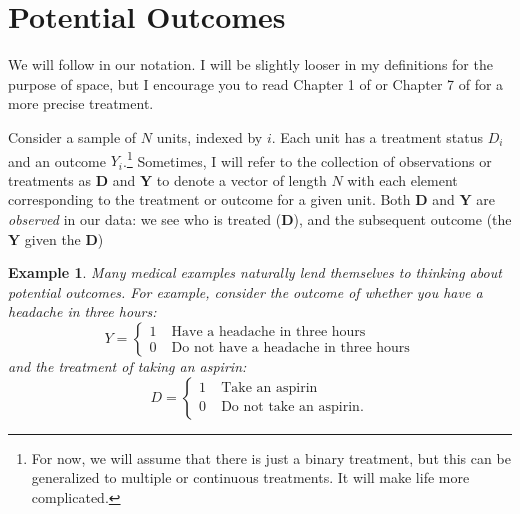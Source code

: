 \documentclass{tufte-handout}
\theoremstyle{break}
\newtheorem{exmp}{Example}
\newcommand{\bY}{\mathbf{Y}}
\newcommand{\bD}{\mathbf{D}}
\begin{document}
\section{Potential Outcomes}
We will follow \citet{imbens2015causal} in our notation. I will be slightly looser in my definitions for the purpose of space, but I encourage you to read Chapter 1 of \citet{imbens2015causal} or Chapter 7 of \citet{aronow2019foundations} for a more precise treatment.

Consider a sample of $N$ units, indexed by $i$. Each unit has a treatment status $D_i$ and an outcome $Y_i$.\footnote{For now, we will assume that there is just a binary treatment, but this can be generalized to multiple or continuous treatments. It will make life more complicated.} Sometimes, I will refer to the collection of observations or treatments as $\bD$ and $\bY$ to denote a vector of length $N$ with each element corresponding to the treatment or outcome for a given unit. Both $\bD$ and $\bY$ are \emph{observed} in our data: we see who is treated ($\bD$), and the subsequent outcome (the $\bY$ given the $\bD$)


\begin{boxD}
  \begin{exmp}
    \label{example1}
    Many medical examples naturally lend themselves to thinking about potential outcomes. For example, consider the outcome of whether you have a headache in three hours:
    \begin{equation*}
      Y = \begin{cases}
        1 & \; \text{Have a headache in three hours} \\
        0 & \; \text{Do not have a headache in three hours}
      \end{cases}
    \end{equation*}
    and the treatment of taking an aspirin:
    \begin{equation*}
      D = \begin{cases}
        1 & \; \text{Take an aspirin} \\
        0 & \; \text{Do not take an aspirin}.
      \end{cases}
    \end{equation*}
  \end{exmp}
  \end{boxD}
\end{document}
